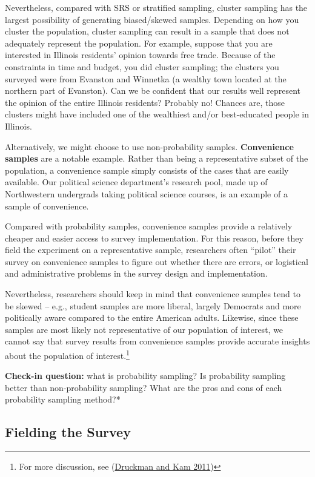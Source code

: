 \documentclass{book}
\begin{document}
Nevertheless, compared with SRS or stratified sampling, cluster sampling has
the largest possibility of generating biased/skewed samples. Depending on how
you cluster the population, cluster sampling can result in a sample that does
not adequately represent the population. For example, suppose that you are
interested in Illinois residents' opinion towards free trade. Because of the
constraints in time and budget, you did cluster sampling; the clusters you
surveyed were from Evanston and Winnetka (a wealthy town located at the
northern part of Evanston). Can we be confident that our results well
represent the opinion of the entire Illinois residents? Probably no! Chances
are, those clusters might have included one of the wealthiest and/or
best-educated people in Illinois.

Alternatively, we might choose to use non-probability samples.
\textbf{Convenience samples} are a notable example. Rather than being a
representative subset of the population, a convenience sample simply consists
of the cases that are easily available. Our political science department's
research pool, made up of Northwestern undergrads taking political science
courses, is an example of a sample of convenience.

Compared with probability samples, convenience samples provide a relatively
cheaper and easier access to survey implementation. For this reason, before
they field the experiment on a representative sample, researchers often
``pilot'' their survey on convenience samples to figure out whether there are
errors, or logistical and administrative problems in the survey design and
implementation.

Nevertheless, researchers should keep in mind that convenience samples tend to
be skewed -- e.g., student samples are more liberal, largely Democrats and
more politically aware compared to the entire American adults. Likewise, since
these samples are most likely not representative of our population of
interest, we cannot say that survey results from convenience samples provide
accurate insights about the population of interest.\footnote{For more
  discussion, see (\protect\hyperlink{ref-druckman2011students}{Druckman and
  Kam 2011})}

\textbf{Check-in question:} what is probability sampling? Is probability
sampling better than non-probability sampling? What are the pros and cons of
each probability sampling method?*

\hypertarget{fielding-the-survey}{%
\subsection{\texorpdfstring{\textbf{Fielding the
Survey}}{Fielding the Survey}}\label{fielding-the-survey}}
\end{document}
